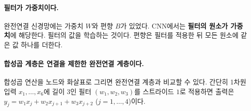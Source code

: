 \documentclass[11pt,a4paper]{article}
\begin{document}
\paragraph{필터가 가중치이다.}
완전연결 신경망에는 가중치 $W$와 편향 $B$가 있었다.
CNN에서는 \textbf{필터의 원소가 가중치}에 해당한다. 필터의 값을 학습하는 것이다.
편향은 필터를 적용한 뒤 모든 원소에 같은 값 하나를 더한다.

\begin{center}
\end{center}

\paragraph{합성곱 계층은 연결을 제한한 완전연결 계층이다.}
합성곱 연산을 노드와 화살표로 그리면 완전연결 계층과 비교할 수 있다.
간단히 1차원 입력 $x_1,\ldots,x_6$에 길이 $3$인 필터 $(w_1,w_2,w_3)$를 스트라이드 $1$로 적용하면
출력은 $y_j=w_1x_j+w_2x_{j+1}+w_3x_{j+2}$ ($j=1,\ldots,4$)이다.
\end{document}
